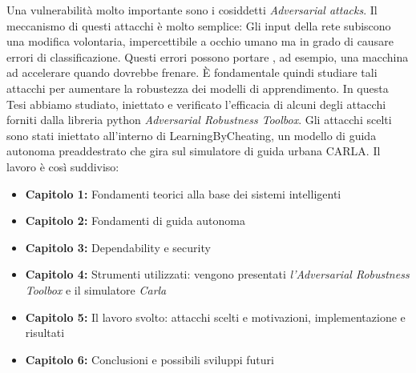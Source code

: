 Una vulnerabilità molto importante sono i cosiddetti \emph{Adversarial attacks}. Il meccanismo di questi attacchi è molto semplice:
Gli input della rete  subiscono una modifica volontaria, impercettibile a occhio umano ma in grado di causare errori di  classificazione.  Questi errori possono portare , ad esempio, una macchina ad accelerare quando
dovrebbe frenare. È fondamentale quindi studiare tali attacchi per aumentare la robustezza dei modelli di apprendimento.
In questa Tesi abbiamo studiato, iniettato e verificato l'efficacia di  alcuni degli attacchi forniti dalla libreria python \emph{Adversarial Robustness Toolbox}. Gli attacchi scelti sono stati iniettato all'interno
di LearningByCheating, un modello di guida autonoma preaddestrato che gira sul simulatore di guida urbana CARLA.
Il lavoro è così suddiviso:
\begin{itemize}
  \item \textbf{Capitolo 1:} Fondamenti teorici alla base dei sistemi intelligenti
  \item \textbf{Capitolo 2:} Fondamenti di guida autonoma
  \item \textbf{Capitolo 3:} Dependability e security
  \item \textbf{Capitolo 4:} Strumenti utilizzati: vengono presentati \emph{l'Adversarial Robustness Toolbox} e il simulatore \emph{Carla}
  \item \textbf{Capitolo 5:} Il lavoro svolto: attacchi scelti e motivazioni, implementazione e risultati
  \item \textbf{Capitolo 6:} Conclusioni e possibili sviluppi futuri
  
\end{itemize}


